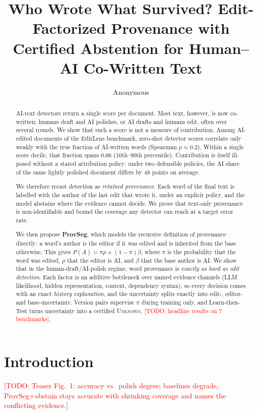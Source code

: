 \documentclass[10pt]{article}
\title{Who Wrote What Survived? Edit-Factorized Provenance with Certified Abstention for Human--AI Co-Written Text}
\author{Anonymous}
\date{}
\newcommand{\todo}[1]{\textcolor{red}{[TODO: #1]}}
\newcommand{\Unk}{\textsc{Unknown}}
\begin{document}
\maketitle

\begin{abstract}
AI-text detectors return a single score per document. Most text, however, is now co-written: humans draft and AI polishes, or AI drafts and humans edit, often over several rounds. We show that such a score is not a measure of contribution. Among AI-edited documents of the EditLens benchmark, zero-shot detector scores correlate only weakly with the true fraction of AI-written words (Spearman $\rho\!\approx\!0.2$). Within a single score decile, that fraction spans $0.66$ (10th--90th percentile). Contribution is itself ill-posed without a stated attribution policy: under two defensible policies, the AI share of the same lightly polished document differs by $48$ points on average.

We therefore recast detection as \emph{retained provenance}. Each word of the final text is labelled with the author of the last edit that wrote it, under an explicit policy, and the model abstains where the evidence cannot decide. We prove that text-only provenance is non-identifiable and bound the coverage any detector can reach at a target error rate.

We then propose \textbf{ProvSeg}, which models the recursive definition of provenance directly: a word's author is the editor if it was edited and is inherited from the base otherwise. This gives $P(A)=\pi\rho+(1-\pi)\beta$, where $\pi$ is the probability that the word was edited, $\rho$ that the editor is AI, and $\beta$ that the base author is AI. We show that in the human-draft/AI-polish regime, word provenance is \emph{exactly as hard as edit detection}. Each factor is an additive bottleneck over named evidence channels (LLM likelihood, hidden representation, context, dependency syntax), so every decision comes with an exact \emph{history explanation}, and the uncertainty splits exactly into edit-, editor- and base-uncertainty. Version pairs supervise $\pi$ during training only, and Learn-then-Test turns uncertainty into a certified \Unk. \todo{headline results on 7 benchmarks}.
\end{abstract}

\section{Introduction}
\todo{Teaser Fig.~1: accuracy vs.\ polish degree; baselines degrade, ProvSeg+abstain stays accurate with shrinking coverage and names the conflicting evidence.}
\end{document}
